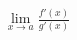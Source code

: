 \documentclass[preview]{standalone}
\begin{document}
\begin{align*}
\lim_{x \to a} \frac{f'(x)}{g'(x)}
\end{align*}
\end{document}

